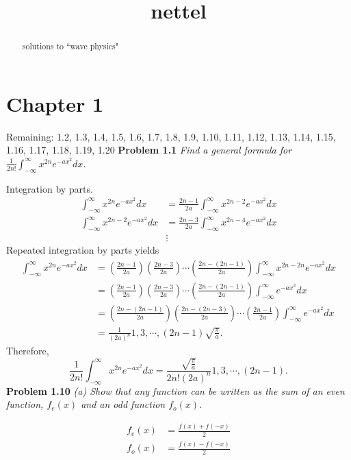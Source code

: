 \documentclass{article}
\title{nettel}
\begin{document}
\maketitle
\begin{abstract}
solutions to ``wave physics"
\end{abstract}
\section{Chapter 1}
Remaining: 1.2, 1.3, 1.4, 1.5, 1.6, 1.7, 1.8, 1.9, 1.10, 1.11, 1.12, 1.13, 1.14, 1.15, 1.16, 1.17, 1.18, 1.19, 1.20
%
%
%
\noindent \textbf{Problem 1.1} \textit{Find a general formula for $\frac{1}{2n!} \int_{-\infty}^{\infty} x^{2n} e^{-ax^2} dx$}.

Integration by parts. 
\begin{align*}
\int_{-\infty}^{\infty} x^{2n} e^{-ax^2} dx &= \frac{2n-1}{2a} \int_{-\infty}^{\infty} x^{2n-2} e^{-ax^2} dx \\
\int_{-\infty}^{\infty} x^{2n-2} e^{-ax^2} dx &= \frac{2n-3}{2a} \int_{-\infty}^{\infty} x^{2n-4} e^{-ax^2} dx \\
& \vdots
\end{align*}
Repeated integration by parts yields
\begin{align*}
\int_{-\infty}^{\infty} x^{2n} e^{-ax^2} dx &= \left( \frac{2n-1}{2a} \right) \left( \frac{2n-3}{2a} \right) \cdots \left( \frac{2n-(2n-1)}{2a} \right) \int_{-\infty}^{\infty} x^{2n - 2n} e^{-ax^2} dx \\
&= \left( \frac{2n-1}{2a} \right) \left( \frac{2n-3}{2a} \right) \cdots \left( \frac{2n-(2n-1)}{2a} \right) \int_{-\infty}^{\infty} e^{-ax^2} dx \\
&=  \left( \frac{2n-(2n-1)}{2a} \right) \left( \frac{2n-(2n-3)}{2a} \right) \cdots \left( \frac{2n-1}{2a} \right) \int_{-\infty}^{\infty} e^{-ax^2} dx \\
&= \frac{1}{(2a)^n} 1, 3, \cdots{}, (2n-1) \sqrt{\frac{\pi}{a}}.
\end{align*}
Therefore,
\begin{equation*}
\frac{1}{2n!} \int_{-\infty}^{\infty} x^{2n} e^{-ax^2} dx = \frac{\sqrt{\frac{\pi}{a}}}{2n! (2a)^n} 1, 3, \cdots{}, (2n-1).
\end{equation*}
%
%
%
\noindent \textbf{Problem 1.10} \textit{(a) Show that any function can be written as the sum of an even function, $f_{e}(x)$ and an odd function $f_{o}(x)$}.

\begin{align*}
f_{e}(x) &= \frac{f(x) + f(-x)}{2}\\
f_{o}(x) &= \frac{f(x) - f(-x)}{2}
\end{align*}
\end{document}
